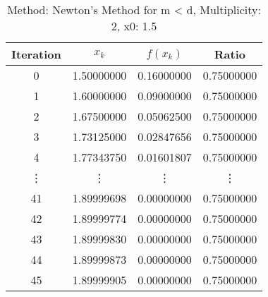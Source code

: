 \begin{table}
\centering
\caption{Method: Newton's Method for m < d, Multiplicity: 2, x0: 1.5}
\label{tab:table_Newton's_Method_for_m_<_d_2_1_5}
\begin{tabular}{c c c c}
\toprule
Iteration &      $x_k$ &   $f(x_k)$ &      Ratio \\
\midrule
        0 & 1.50000000 & 0.16000000 & 0.75000000 \\
        1 & 1.60000000 & 0.09000000 & 0.75000000 \\
        2 & 1.67500000 & 0.05062500 & 0.75000000 \\
        3 & 1.73125000 & 0.02847656 & 0.75000000 \\
        4 & 1.77343750 & 0.01601807 & 0.75000000 \\
   \vdots &     \vdots &     \vdots &     \vdots \\
       41 & 1.89999698 & 0.00000000 & 0.75000000 \\
       42 & 1.89999774 & 0.00000000 & 0.75000000 \\
       43 & 1.89999830 & 0.00000000 & 0.75000000 \\
       44 & 1.89999873 & 0.00000000 & 0.75000000 \\
       45 & 1.89999905 & 0.00000000 & 0.75000000 \\
\bottomrule
\end{tabular}
\end{table}
